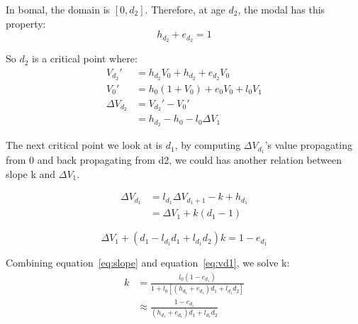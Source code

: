\documentclass[12pt, letterpaper]{article}
\begin{document}
In bomal, the domain is $[0,d_2]$. Therefore, at age $d_2$, the modal has this property:
\begin{equation}
h_{d_2} + e_{d_2} = 1
\end{equation}

So $d_2$ is a critical point where:
\begin{equation}
\begin{aligned}
V_{d_2}' & = h_{d_2} V_0 + h_{d_2} + e_{d_2} V_0 \\
V_0' & = h_0 (1+V_0) + e_0 V_0 + l_0 V_1 \\
\Delta V_{d_2} & = V_{d_2}' - V_0' \\
& = h_{d_2} - h_0 - l_0 \Delta V_1
\end{aligned}
\end{equation}

The next critical point we look at is $d_1$, by computing $\Delta V_{d_1}$'s
value propagating from 0 and back propagating from d2, we could has another
relation between slope k and $\Delta V_1$.

\begin{equation}
\label{eq:vd1}
\begin{aligned}
\Delta V_{d_1} & = l_{d_1} \Delta V_{d_1+1} - k + h_{d_1} \\
& = \Delta V_{1} + k(d_1 - 1)
\end{aligned}
\end{equation}

\begin{equation}
\Delta V_1 + (d_1 - l_{d_1}d_1 + l_{d_1}d_2)k = 1-e_{d_1}
\end{equation}

Combining equation~\ref{eq:slope} and equation~\ref{eq:vd1}, we solve k:
\begin{equation}
\begin{aligned}
k & = \frac{l_0 (1-e_{d_1})}{1+l_0 [(h_{d_1}+e_{d_1})d_1+l_{d_1}d_2]} \\
& \approx \frac{1-e_{d_1}}{(h_{d_1}+e_{d_1})d_1+l_{d_1}d_2} \\
\end{aligned}
\end{equation}


{}

\end{document}
